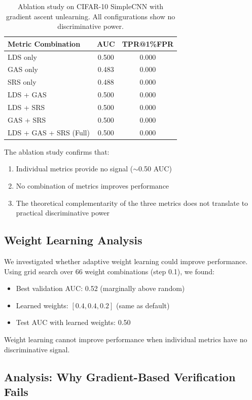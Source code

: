 \documentclass{article}
\begin{document}
\begin{table}[t]
\caption{Ablation study on CIFAR-10 SimpleCNN with gradient ascent unlearning. All configurations show no discriminative power.}
\label{tab:ablation}
\centering
\begin{tabular}{lcc}
\toprule
Metric Combination & AUC & TPR@1\%FPR \\
\midrule
LDS only & 0.500 & 0.000 \\
GAS only & 0.483 & 0.000 \\
SRS only & 0.488 & 0.000 \\
LDS + GAS & 0.500 & 0.000 \\
LDS + SRS & 0.500 & 0.000 \\
GAS + SRS & 0.500 & 0.000 \\
LDS + GAS + SRS (Full) & 0.500 & 0.000 \\
\bottomrule
\end{tabular}
\end{table}

The ablation study confirms that:\
\begin{enumerate}
    \item Individual metrics provide no signal ($\sim$0.50 AUC)
    \item No combination of metrics improves performance
    \item The theoretical complementarity of the three metrics does not translate to practical discriminative power
\end{enumerate}

\subsection{Weight Learning Analysis}

We investigated whether adaptive weight learning could improve performance. Using grid search over 66 weight combinations (step 0.1), we found:
\begin{itemize}
    \item Best validation AUC: 0.52 (marginally above random)
    \item Learned weights: $[0.4, 0.4, 0.2]$ (same as default)
    \item Test AUC with learned weights: 0.50
\end{itemize}

Weight learning cannot improve performance when individual metrics have no discriminative signal.

\subsection{Analysis: Why Gradient-Based Verification Fails}
\end{document}
